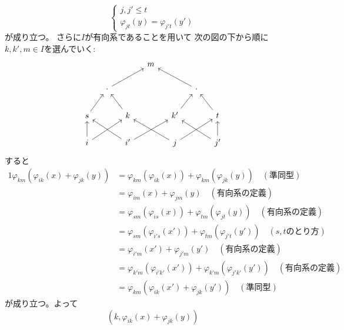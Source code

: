 \documentclass[report]{jlreq}
\begin{document}
\begin{answer}
\begin{innerproof}
\begin{equation}
\begin{cases}
                j, j' \le t \\
                \varphi_{jt}(y) = \varphi_{j't}(y')
            \end{cases}
        \end{equation}
        が成り立つ。
        さらに$I$が有向系であることを用いて
        次の図の下から順に$k, k', m \in I$を選んでいく:
        \begin{equation}
            \begin{tikzcd}[column sep=small]
                &&& m \\
                & \cdot \ar{rru} &&&& \cdot \ar{llu} \\
                s \ar{ru}
                    && k \ar{lu}
                    && k' \ar{ru}
                    && t \ar{lu} \\
                i \ar{u} \ar{rru}
                    && i' \ar{llu} \ar{rru}
                    && j \ar{llu} \ar{rru}
                    && j' \ar{llu} \ar{u}
            \end{tikzcd}
        \end{equation}
        すると
        \begin{alignat}{1}
            \varphi_{km} (\varphi_{ik}(x) + \varphi_{jk}(y))
                &= \varphi_{km} (\varphi_{ik} (x)) + \varphi_{km} (\varphi_{jk} (y))
                    \quad (\text{準同型}) \\
                &= \varphi_{im} (x) + \varphi_{jm} (y)
                    \quad (\text{有向系の定義}) \\
                &= \varphi_{sm} (\varphi_{is} (x)) + \varphi_{tm} (\varphi_{jt} (y))
                    \quad (\text{有向系の定義}) \\
                &= \varphi_{sm} (\varphi_{i's} (x')) + \varphi_{tm} (\varphi_{j't} (y'))
                    \quad (\text{$s, t$のとり方}) \\
                &= \varphi_{i'm} (x') + \varphi_{j'm} (y')
                    \quad (\text{有向系の定義}) \\
                &= \varphi_{k'm} (\varphi_{i'k'} (x')) + \varphi_{k'm} (\varphi_{j'k'} (y'))
                    \quad (\text{有向系の定義}) \\
                &= \varphi_{km} (\varphi_{ik}(x') + \varphi_{jk}(y'))
                    \quad (\text{準同型})
        \end{alignat}
        が成り立つ。よって
        \begin{equation}
            (k, \varphi_{ik}(x) + \varphi_{jk}(y))

\end{equation}
\end{innerproof}
\end{answer}
\end{document}
